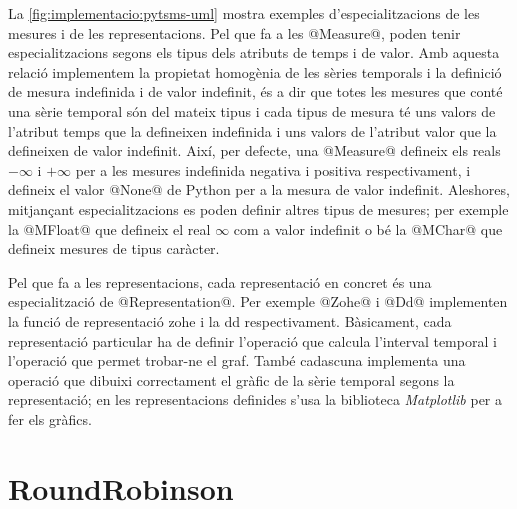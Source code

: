 La \autoref{fig:implementacio:pytsms-uml} mostra exemples
d'especialitzacions de les mesures i de les representacions.
%
Pel que fa a les @Measure@, poden tenir especialitzacions segons
els tipus dels atributs de temps i de valor. Amb aquesta relació
implementem la propietat homogènia de les sèries temporals i la
definició de mesura indefinida i de valor indefinit, és a dir que
totes les mesures que conté una sèrie temporal són del mateix tipus i
cada tipus de mesura té uns valors de l'atribut temps que la
defineixen indefinida i uns valors de l'atribut valor que la
defineixen de valor indefinit.  Així, per defecte, una @Measure@
defineix els reals $-\infty$ i $+\infty$ per a les mesures indefinida
negativa i positiva respectivament, i defineix el valor @None@ de
Python per a la mesura de valor indefinit. Aleshores, mitjançant
especialitzacions es poden definir altres tipus de mesures; per
exemple la @MFloat@ que defineix el real $\infty$ com a valor
indefinit o bé la @MChar@ que defineix mesures de tipus caràcter.




Pel que fa a les representacions, cada representació en concret és una
especialització de @Representation@. Per exemple @Zohe@ i
@Dd@ implementen la funció de representació \gls{zohe} i la \gls{dd}
respectivament.
Bàsicament, cada representació particular ha de definir l'operació que
calcula l'interval temporal i l'operació que permet trobar-ne el graf.
També cadascuna implementa una operació que dibuixi correctament el
gràfic de la sèrie temporal segons la representació; en les
representacions definides s'usa la biblioteca
\emph{Matplotlib} \parencite{python:matplotlib}  per a fer els gràfics.















\section{RoundRobinson}

